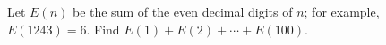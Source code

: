 Let $E(n)$ be the sum of the even decimal digits of $n$; for example, $E(1243)=6$. Find $E(1)+E(2)+\cdots+E(100)$.
